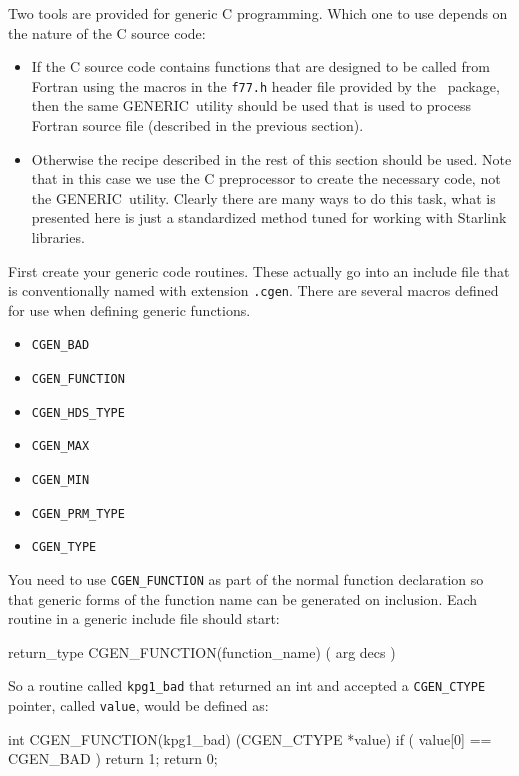 \documentclass[twoside,11pt,nolof]{starlink}
\providecommand{\GENERIC}{{\footnotesize GENERIC}\normalsize}
\providecommand{\CNF}{{\footnotesize CNF}\normalsize}
\providecommand{\CNFref}{\xref{\CNF}{sun209}{}}
\begin{document}
Two tools are provided for generic C programming. Which one to use
depends on the nature of the C source code:

\begin{itemize}
\item If the C source code contains functions that are designed to be
called from Fortran using the macros in the \verb+f77.h+  header file provided
by the \CNFref\ package, then the same \GENERIC\ utility should be
used that is used to process Fortran source file (described in the
previous section).
\item Otherwise the recipe described in the rest of this section should
be used. Note that in this case we use the C preprocessor to create the
necessary code, not the \GENERIC\ utility. Clearly there are many ways to
do this task, what is presented here is just a standardized method tuned
for working with Starlink libraries.
\end{itemize}

First create your generic code routines. These actually go into an include
file that is conventionally named with extension \texttt{.cgen}. There are several
macros defined for use when defining generic functions.

\begin{itemize}
\item \texttt{CGEN\_BAD}
\item \texttt{CGEN\_FUNCTION}
\item \texttt{CGEN\_HDS\_TYPE}
\item \texttt{CGEN\_MAX}
\item \texttt{CGEN\_MIN}
\item \texttt{CGEN\_PRM\_TYPE}
\item \texttt{CGEN\_TYPE}
\end{itemize}

You need to use \texttt{CGEN\_FUNCTION} as part of the normal function
declaration so that generic forms of the function name can be generated on
inclusion. Each routine in a generic include file should start:

\begin{terminalv}
return_type CGEN_FUNCTION(function_name) ( arg decs )
\end{terminalv}

So a routine called \texttt{kpg1\_bad} that returned an int and accepted a
\texttt{CGEN\_CTYPE} pointer, called \texttt{value}, would be defined as:

\begin{terminalv}
    int CGEN_FUNCTION(kpg1_bad) (CGEN_CTYPE *value) {
        if ( value[0] == CGEN_BAD ) {
           return 1;
        }
        return 0;
    }
\end{terminalv}
\end{document}
